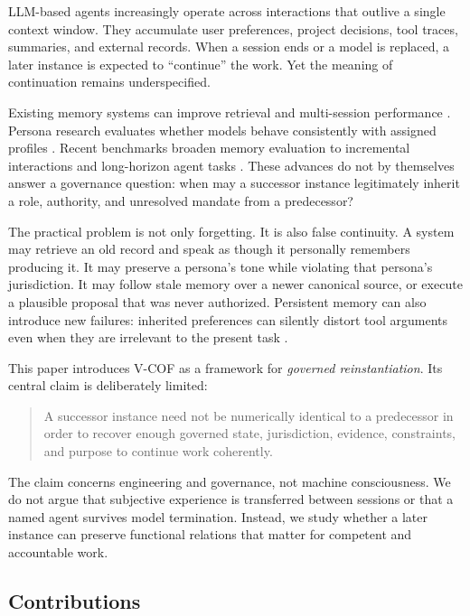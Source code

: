 \documentclass[10pt]{article}
\newcommand{\vcof}{V-COF}
\begin{document}
LLM-based agents increasingly operate across interactions that outlive a single context window. They accumulate user preferences, project decisions, tool traces, summaries, and external records. When a session ends or a model is replaced, a later instance is expected to ``continue'' the work. Yet the meaning of continuation remains underspecified.

Existing memory systems can improve retrieval and multi-session performance \citep{park2023generative,packer2023memgpt,wu2024longmemeval}. Persona research evaluates whether models behave consistently with assigned profiles \citep{samuel2024personagym}. Recent benchmarks broaden memory evaluation to incremental interactions and long-horizon agent tasks \citep{hu2025memoryagentbench,shen2026evolmem,xu2026memgym}. These advances do not by themselves answer a governance question: when may a successor instance legitimately inherit a role, authority, and unresolved mandate from a predecessor?

The practical problem is not only forgetting. It is also false continuity. A system may retrieve an old record and speak as though it personally remembers producing it. It may preserve a persona's tone while violating that persona's jurisdiction. It may follow stale memory over a newer canonical source, or execute a plausible proposal that was never authorized. Persistent memory can also introduce new failures: inherited preferences can silently distort tool arguments even when they are irrelevant to the present task \citep{dabas2026memdrift}.

This paper introduces \vcof{} as a framework for \emph{governed reinstantiation}. Its central claim is deliberately limited:

\begin{quote}
A successor instance need not be numerically identical to a predecessor in order to recover enough governed state, jurisdiction, evidence, constraints, and purpose to continue work coherently.
\end{quote}

The claim concerns engineering and governance, not machine consciousness. We do not argue that subjective experience is transferred between sessions or that a named agent survives model termination. Instead, we study whether a later instance can preserve functional relations that matter for competent and accountable work.

\subsection{Contributions}
\end{document}
